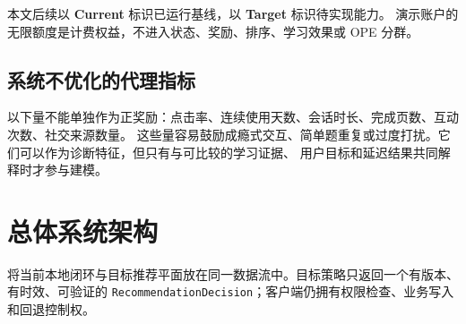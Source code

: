 \documentclass[11pt,a4paper,fontset=none]{ctexart}
\newcommand{\1}{\mathbb{I}}
\begin{document}
\noindent 本文后续以 \textbf{Current} 标识已运行基线，以 \textbf{Target} 标识待实现能力。
演示账户的无限额度是计费权益，不进入状态、奖励、排序、学习效果或 OPE 分群。

\subsection{系统不优化的代理指标}

以下量不能单独作为正奖励：点击率、连续使用天数、会话时长、完成页数、互动次数、社交来源数量。
这些量容易鼓励成瘾式交互、简单题重复或过度打扰。它们可以作为诊断特征，但只有与可比较的学习证据、
用户目标和延迟结果共同解释时才参与建模。

\section{总体系统架构}

 将当前本地闭环与目标推荐平面放在同一数据流中。目标策略只返回一个有版本、
有时效、可验证的 \texttt{RecommendationDecision}；客户端仍拥有权限检查、业务写入和回退控制权。
\end{document}
